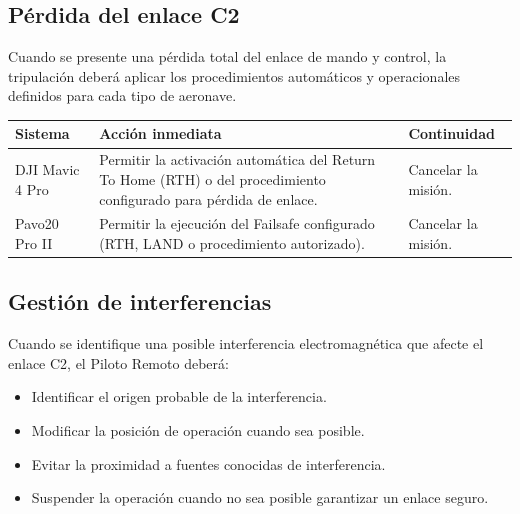 \subsection{Pérdida del enlace C2}

Cuando se presente una pérdida total del enlace de mando y control, la tripulación deberá aplicar los procedimientos automáticos y operacionales definidos para cada tipo de aeronave.

\renewcommand{\arraystretch}{1.3}

\begin{longtable}{|p{4.5cm}|p{6cm}|p{3cm}|}

\hline

\textbf{Sistema} &
\textbf{Acción inmediata} &
\textbf{Continuidad}

\\ \hline

DJI Mavic 4 Pro &
Permitir la activación automática del Return To Home (RTH) o del procedimiento configurado para pérdida de enlace. &
Cancelar la misión.

\\ \hline

Pavo20 Pro II &
Permitir la ejecución del Failsafe configurado (RTH, LAND o procedimiento autorizado). &
Cancelar la misión.

\\ \hline

\end{longtable}


\subsection{Gestión de interferencias}

Cuando se identifique una posible interferencia electromagnética que afecte el enlace C2, el Piloto Remoto deberá:

\begin{itemize}

\item Identificar el origen probable de la interferencia.

\item Modificar la posición de operación cuando sea posible.

\item Evitar la proximidad a fuentes conocidas de interferencia.

\item Suspender la operación cuando no sea posible garantizar un enlace seguro.

\end{itemize}

